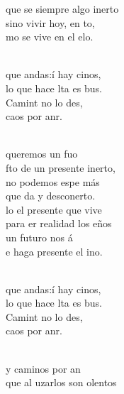 \begin{cancion}
	que se siempre algo inerto\\
	sino vivir hoy, en to, \\
	mo se vive en el elo. \\\jump\\
	\begin{chorus}%
	 que andas:í hay cinos,  \\
	lo que hace lta es bus.\\
	Camint no lo des,\\
	 caos por anr.\\
	\end{chorus}%
	\jump\\
	 queremos un fuo \\
	fto de un presente inerto,\\
	no podemos espe más \\
	que da y desconerto.\\
	lo el presente que vive \\
	para er realidad los eños\\
	un futuro nos á \\
	e haga presente el ino. \\\jump\\
	\begin{chorus}%
	 que andas:í hay cinos,  \\
	lo que hace lta es bus.\\
	Camint no lo des,\\
	 caos por anr.\\
	\end{chorus}%
	\jump\\
	y caminos por an \\
	que al uzarlos son olentos\\

\end{cancion}
